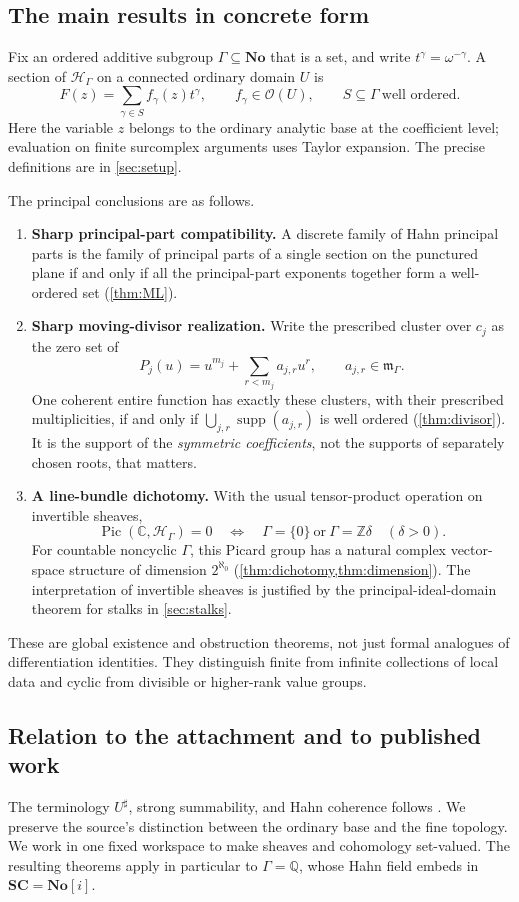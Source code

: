 \documentclass[11pt,letterpaper]{article}
\theoremstyle{definition}
\theoremstyle{remark}
\newcommand{\No}{\mathbf{No}}
\newcommand{\SC}{\mathbf{SC}}
\newcommand{\C}{\mathbb C}
\newcommand{\Z}{\mathbb Z}
\newcommand{\Q}{\mathbb Q}
\newcommand{\OO}{\mathcal O}
\newcommand{\HH}{\mathscr H_\Gamma}
\newcommand{\mm}{\mathfrak m_\Gamma}
\newcommand{\sh}{^{\sharp}}
\newcommand{\supp}{\operatorname{supp}}
\newcommand{\Pic}{\operatorname{Pic}}
\numberwithin{equation}{section}
\begin{document}
\subsection{The main results in concrete form}
Fix an ordered additive subgroup $\Gamma\subseteq\No$ that is a set, and write $t^\gamma=\omega^{-\gamma}$. A section of $\HH$ on a connected ordinary domain $U$ is
\[
 F(z)=\sum_{\gamma\in S} f_\gamma(z)t^\gamma,
 \qquad f_\gamma\in\OO(U),\qquad S\subseteq\Gamma\ \text{well ordered}.
\]
Here the variable $z$ belongs to the ordinary analytic base at the coefficient level; evaluation on finite surcomplex arguments uses Taylor expansion. The precise definitions are in \cref{sec:setup}.

The principal conclusions are as follows.
\begin{enumerate}
\item \textbf{Sharp principal-part compatibility.} A discrete family of Hahn principal parts is the family of principal parts of a single section on the punctured plane if and only if all the principal-part exponents together form a well-ordered set (\cref{thm:ML}).
\item \textbf{Sharp moving-divisor realization.} Write the prescribed cluster over $c_j$ as the zero set of
\[
 P_j(u)=u^{m_j}+\sum_{r<m_j}a_{j,r}u^r,
 \qquad a_{j,r}\in\mm.
\]
One coherent entire function has exactly these clusters, with their prescribed multiplicities, if and only if $\bigcup_{j,r}\supp(a_{j,r})$ is well ordered (\cref{thm:divisor}). It is the support of the \emph{symmetric coefficients}, not the supports of separately chosen roots, that matters.
\item \textbf{A line-bundle dichotomy.} With the usual tensor-product operation on invertible sheaves,
\[
 \Pic(\C,\HH)=0
 \quad\Longleftrightarrow\quad
 \Gamma=\{0\}\ \text{or}\ \Gamma=\Z\delta\quad(\delta>0).
\]
For countable noncyclic $\Gamma$, this Picard group has a natural complex vector-space structure of dimension $2^{\aleph_0}$ (\cref{thm:dichotomy,thm:dimension}). The interpretation of invertible sheaves is justified by the principal-ideal-domain theorem for stalks in \cref{sec:stalks}.
\end{enumerate}
These are global existence and obstruction theorems, not just formal analogues of differentiation identities. They distinguish finite from infinite collections of local data and cyclic from divisible or higher-rank value groups.

\subsection{Relation to the attachment and to published work}\label{sub:literature}
The terminology $U\sh$, strong summability, and Hahn coherence follows \cite{Source}. We preserve the source's distinction between the ordinary base and the fine topology. We work in one fixed workspace to make sheaves and cohomology set-valued. The resulting theorems apply in particular to $\Gamma=\Q$, whose Hahn field embeds in $\SC=\No[i]$.
\end{document}
